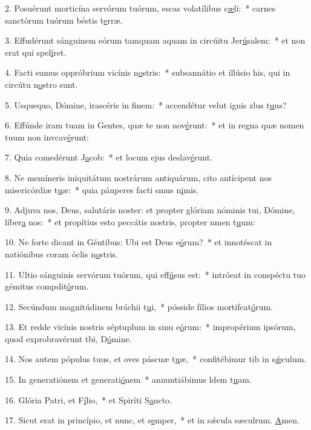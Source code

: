 2. Posuérunt morticína servórum tuórum, escas volatílibus c\uline{æ}li:~* carnes sanctórum tuórum béstis t\uline{e}rræ.\par 
3. Effudérunt sánguinem eórum tamquam aquam in circúitu Jer\uline{ú}salem:~* et non erat qui spel\uline{í}ret.\par 
4. Facti sumus oppróbrium vicínis n\uline{o}stris:~* subsannátio et illúsio his, qui in circútu n\uline{o}stro sunt.\par 
5. Usquequo, Dómine, irascéris in f\uline{i}nem:~* accendétur velut ignis zlus t\uline{u}us?\par 
6. Effúnde iram tuam in Gentes, quæ te non nov\uline{é}runt:~* et in regna quæ nomen tuum non invcav\uline{é}runt:\par 
7. Quia comedérunt J\uline{a}cob:~* et locum ejus deslav\uline{é}runt.\par 
8. Ne memíneris iniquitátum nostrárum antiquárum, cito antícipent nos misericórdiæ t\uline{u}æ:~* quia páuperes facti smus n\uline{i}mis.\par 
9. Adjuva nos, Deus, salutáris noster: et propter glóriam nóminis tui, Dómine, líber\uline{a} nos:~* et propítius esto peccátis nostris, propter nmen t\uline{u}um:\par 
10. Ne forte dicant in Géntibus: Ubi est Deus e\uline{ó}rum?~* et innotéscat in natiónibus coram óclis n\uline{o}stris.\par 
11. Ultio sánguinis servórum tuórum, qui eff\uline{ú}sus est:~* intróeat in conspéctu tuo gémitus compdit\uline{ó}rum.\par 
12. Secúndum magnitúdinem bráchii t\uline{u}i,~* pósside fílios mortifcat\uline{ó}rum.\par 
13. Et redde vicínis nostris séptuplum in sinu e\uline{ó}rum:~* impropérium ipsórum, quod exprobravérunt tbi, D\uline{ó}mine.\par 
14. Nos autem pópulus tuus, et oves páscuæ t\uline{u}æ,~* confitébimur tib in s\uline{ǽ}culum.\par 
15. In generatiónem et generati\uline{ó}nem~* annuntiábimus ldem t\uline{u}am.\par 
16. Glória Patri, et F\uline{í}lio,~* et Spiríti S\uline{a}ncto.\par 
17. Sicut erat in princípio, et nunc, et s\uline{e}mper,~* et in sǽcula sæculrum. \uline{A}men.\par 
